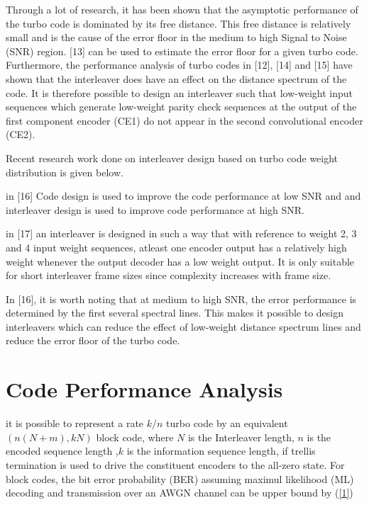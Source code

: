 \documentclass[11pt, oneside, dvipdfmx]{book}
\begin{document}
Through a lot of research, it has been shown that the asymptotic performance of the turbo code is dominated by its free distance. This free distance is relatively small and is the cause of the error floor in the medium to high Signal to Noise (SNR) region. [13] can be used to estimate the error floor for a given turbo code. Furthermore, the performance analysis of turbo codes in [12], [14] and [15] have shown that the interleaver does have an effect on the distance spectrum of the code. It is therefore possible to design an interleaver such that low-weight input sequences which generate low-weight parity check sequences at the output of the first component encoder (CE1) do not appear in the second convolutional encoder (CE2).

Recent research work done on interleaver design based on turbo code weight distribution is given below.


\begin{description}
\item in [16] Code design is used to improve the code performance at low SNR and and interleaver design is used to improve code performance at high SNR.

\item in [17] an interleaver is designed in such a way that with reference to weight 2, 3 and 4 input weight sequences, atleast one encoder output has a relatively high weight whenever the output decoder has a low weight output. It is only suitable for short interleaver frame sizes since complexity increases with frame size.
\end{description}

In [16], it is worth noting that at medium to high SNR, the error performance is determined by the first several spectral lines. This makes it possible to design interleavers which can reduce the effect of low-weight distance spectrum lines and reduce the error floor of the turbo code.

\section{Code Performance Analysis}
it is possible to represent a rate $k/n$ turbo code by an equivalent $(n(N+m),kN)$ block code, where $N$ is the Interleaver length, $n$ is the encoded sequence length ,$k$ is the information sequence length, if trellis termination is used to drive the constituent encoders to the all-zero state. For block codes, the bit error probability (BER) assuming maximul likelihood (ML) decoding and transmission over an AWGN channel can be upper bound by (\ref{1})
\end{document}
